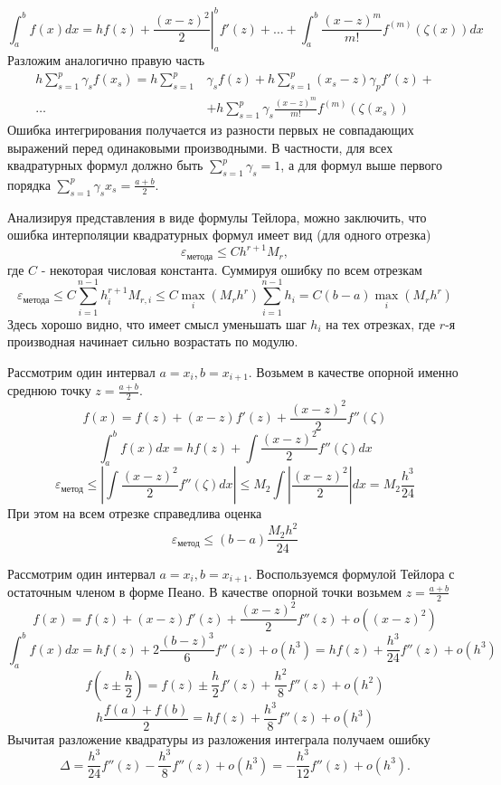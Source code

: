 \documentclass[professionalfonts,compress,unicode]{beamer}
\begin{document}
{
	$$
	\int_a^b f(x) dx = h f(z) + \left.\frac{(x-z)^2}{2}\right|_a^b f'(z) + \dots + \int_a^b \frac{(x-z)^{m}}{m!}f^{(m)}(\zeta(x)) dx
	$$
	Разложим аналогично правую часть
	\begin{align*}
		h \sum_{s=1}^p \gamma_s f(x_s) = h \sum_{s=1}^p &\gamma_s f(z) + h \sum_{s=1}^p (x_s-z)\gamma_p f'(z) + \\
	\dots&+ h \sum_{s=1}^p \gamma_s \frac{(x-z)^{m}}{m!} f^{(m)}(\zeta(x_s))
	\end{align*}
	Ошибка интегрирования получается из разности первых не совпадающих выражений перед одинаковыми производными. В частности, для всех 
	квадратурных формул должно быть $\sum_{s=1}^p \gamma_s = 1$, а для формул выше первого порядка $\sum_{s=1}^p \gamma_s x_s = \frac{a+b}{2}$.
}

{
	Анализируя представления в виде формулы Тейлора, можно заключить, что
	ошибка интерполяции квадратурных формул имеет вид (для одного отрезка)
	$$
	\varepsilon_{\text{метода}} \leq C h^{r+1} M_r,
	$$
	где $C$ - некоторая числовая константа.
	Суммируя ошибку по всем отрезкам
	$$
	\varepsilon_{\text{метода}} \leq C \sum_{i=1}^{n-1} h_i^{r+1} M_{r,i} \leq C \max_i \left(M_r h^r\right) \sum_{i=1}^{n-1} h_i = 
	C(b-a)\max_i \left(M_r h^r\right)
	$$
	Здесь хорошо видно, что имеет смысл уменьшать шаг $h_i$ на тех отрезках, где $r$-я производная начинает 
	сильно возрастать по модулю.
}

{
	Рассмотрим один интервал $a=x_i, b=x_{i+1}$.
	Возьмем в качестве опорной именно среднюю точку $z = \frac{a+b}{2}$.
	$$
	f(x) = f(z) + (x-z)f'(z) + \frac{(x-z)^2}{2}f''(\zeta)
	$$
	$$
	\int_a^b f(x) dx = h f(z) + \int \frac{(x-z)^2}{2}f''(\zeta) dx
	$$
	$$
	\varepsilon_{\text{метод}} \leq \left|\int \frac{(x-z)^2}{2}f''(\zeta) dx \right|
	\leq M_2 \int \left|\frac{(x-z)^2}{2}\right| dx  = M_2 \frac{h^3}{24}
	$$
	При этом на всем отрезке справедлива оценка
	$$
	\varepsilon_{\text{метод}} \leq (b-a) \frac{M_2h^2}{24}
	$$
}

{
	Рассмотрим один интервал $a=x_i, b=x_{i+1}$.
	Воспользуемся формулой Тейлора с остаточным членом в форме Пеано. В качестве опорной точки возьмем $z = \frac{a+b}{2}$
	$$
	f(x) = f(z) + (x-z)f'(z) + \frac{(x-z)^2}{2}f''(z) + o((x-z)^2)
	$$
	$$
	\int_a^b f(x) dx = h f(z) + 2\frac{(b-z)^3}{6}f''(z) + o(h^3) = hf(z) + \frac{h^3}{24}f''(z) + o(h^3)
	$$
	$$
	f\left(z \pm \frac{h}{2}\right) = f(z) \pm \frac{h}{2} f'(z) + \frac{h^2}{8} f''(z) + o(h^2)
	$$
	$$
	h\frac{f(a)+f(b)}{2} = hf(z) + \frac{h^3}{8} f''(z) + o(h^3)
	$$
	Вычитая разложение квадратуры из разложения интеграла получаем ошибку
	$$
	\Delta = \frac{h^3}{24}f''(z) - \frac{h^3}{8}f''(z) + o(h^3) = -\frac{h^3}{12}f''(z) + o(h^3).
	$$
}
\end{document}
